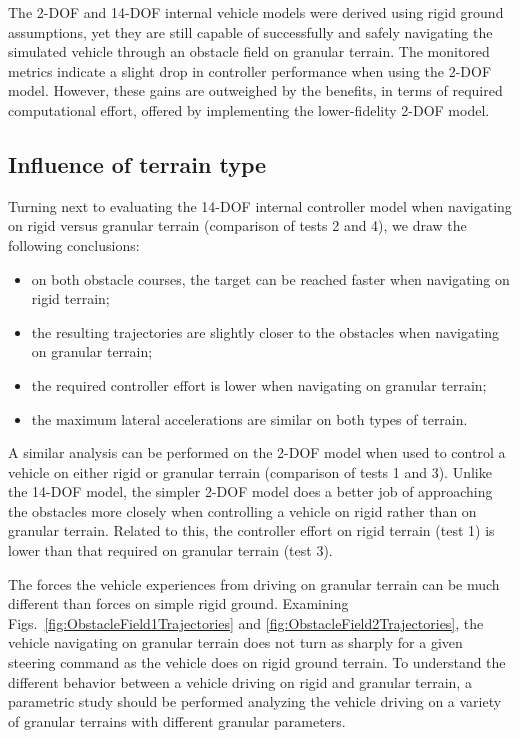 \documentclass[12pt,onecolumn]{article}
\begin{document}
The 2-DOF and 14-DOF internal vehicle models were derived using rigid ground assumptions, yet they are still capable of successfully and safely navigating the simulated vehicle through an obstacle field on granular terrain. The monitored metrics indicate a slight drop in controller performance when using the 2-DOF model. However, these gains are outweighed by the benefits, in terms of required computational effort, offered by implementing the lower-fidelity 2-DOF model. 

\subsection{Influence of terrain type}

Turning next to evaluating the 14-DOF internal controller model when navigating on rigid versus granular terrain (comparison of tests 2 and 4), we draw the following conclusions:
\begin{itemize}
\item on both obstacle courses, the target can be reached faster when navigating on rigid terrain;
\item the resulting trajectories are slightly closer to the obstacles when navigating on granular terrain;
\item the required controller effort is lower when navigating on granular terrain;
\item the maximum lateral accelerations are similar on both types of terrain.
\end{itemize}

A similar analysis can be performed on the 2-DOF model when used to control a vehicle on either rigid or granular terrain (comparison of tests 1 and 3). Unlike the 14-DOF model, the simpler 2-DOF model does a better job of approaching the obstacles more closely when controlling a vehicle on rigid rather than on granular terrain. Related to this, the controller effort on rigid terrain (test 1) is lower than that required on granular terrain (test 3). 

The forces the vehicle experiences from driving on granular terrain can be much different than forces on simple rigid ground. Examining Figs.~\ref{fig:ObstacleField1Trajectories} and \ref{fig:ObstacleField2Trajectories}, the vehicle navigating on granular terrain does not turn as sharply for a given steering command as the vehicle does on rigid ground terrain. To understand the different behavior between a vehicle driving on rigid and granular terrain, a parametric study should be performed analyzing the vehicle driving on a variety of granular terrains with different granular parameters. 
\end{document}
